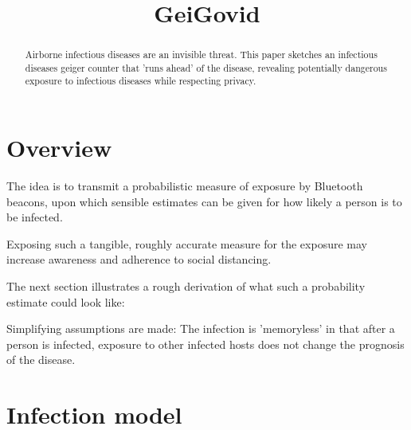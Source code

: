 \documentclass{article}
\title{GeiGovid}
\begin{document}
\maketitle
\begin{abstract}
  Airborne infectious diseases are an invisible threat.
  This paper sketches an infectious diseases geiger counter that 'runs ahead' of
  the disease, revealing potentially dangerous exposure
  to infectious diseases while respecting privacy.
\end{abstract}

\section{Overview}


The idea is to transmit a probabilistic measure of exposure by Bluetooth beacons, upon
which sensible estimates can be given for how likely a person is to be infected.


Exposing such a tangible, roughly accurate measure for the exposure
may increase awareness and adherence to social distancing.


The next section illustrates a rough derivation of what such a
probability estimate could look like:

Simplifying assumptions are made: The infection is 'memoryless' in that after a
person is
infected, exposure to other infected hosts does not change the prognosis of
the disease.

\section{Infection model}
\end{document}
